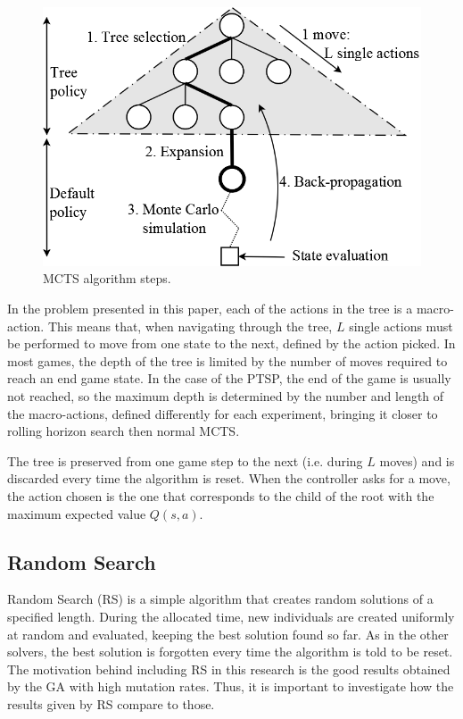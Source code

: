 \documentclass{sig-alternate}
\begin{document}
\begin{figure} [!t]
	\begin{center}
	\includegraphics[scale=0.25,natwidth=708,natheight=484]{img/mcts.png}
	\caption{MCTS algorithm steps.}
	\label{fig:mcts}
	\end{center}
\end{figure}

In the problem presented in this paper, each of the actions in the tree is a macro-action. This means that, when navigating through the tree, $L$ single actions must be performed to move from one state to the next, defined by the action picked. In most games, the depth of the tree is limited by the number of moves required to reach an end game state. In the case of the PTSP, the end of the game is usually not reached, so the maximum depth is determined by the number and length of the macro-actions, defined differently for each experiment, bringing it closer to rolling horizon search then normal MCTS. 

The tree is preserved from one game step to the next (i.e. during $L$ moves) and is discarded every time the algorithm is reset. When the controller asks for a move, the action chosen is the one that corresponds to the child of the root with the maximum expected value $Q(s,a)$.



\subsection{Random Search}

Random Search (RS) is a simple algorithm that creates random solutions of a specified length. During the allocated time, new individuals are created uniformly at random and evaluated, keeping the best solution found so far. As in the other solvers, the best solution is forgotten every time the algorithm is told to be reset. The motivation behind including RS in this research is the good results obtained by the GA with high mutation rates. Thus, it is important to investigate how the results given by RS compare to those.
\end{document}
